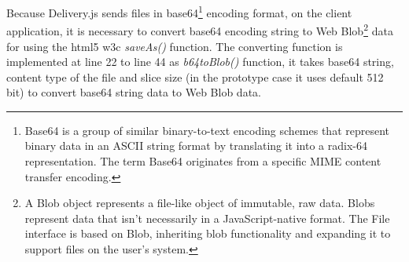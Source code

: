 \par Because Delivery.js sends files in base64\footnote{Base64 is a group of similar binary-to-text encoding schemes that represent binary data in an ASCII string format by translating it into a radix-64 representation. The term Base64 originates from a specific MIME content transfer encoding.\cite{wiki:base64}} encoding format, on the client application, it is necessary to convert base64 encoding string to Web Blob\footnote{A Blob object represents a file-like object of immutable, raw data. Blobs represent data that isn't necessarily in a JavaScript-native format. The File interface is based on Blob, inheriting blob functionality and expanding it to support files on the user's system.\cite{mdn:blob}} data for using the \gls{html5} \gls{w3c} \textit{saveAs()} function. The converting function is implemented at line 22 to line 44 as \textit{b64toBlob()} function, it takes base64 string, content type of the file and slice size (in the prototype case it uses default 512 bit) to convert base64 string data to Web Blob data.

